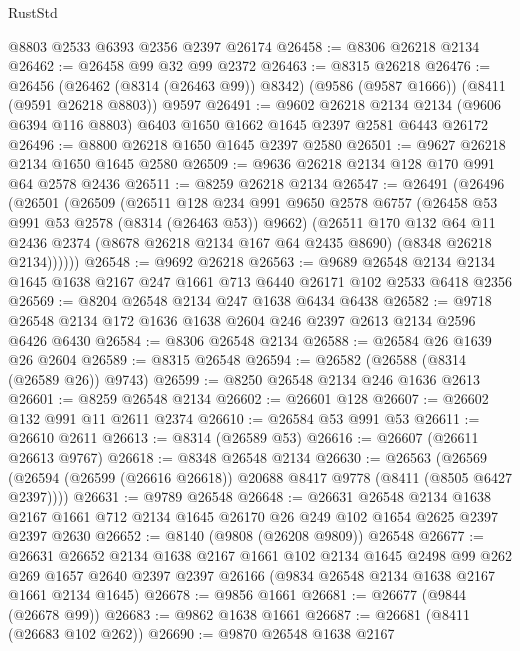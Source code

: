 \begin{lexlean}{RustStd}
\begin{coremodule}
    @8803
    @2533
    @6393
    @2356
    @2397
    @26174
@26458 := @8306 @26218 @2134
@26462 := @26458 @99 @32 @99 @2372
@26463 := @8315 @26218
@26476 := @26456
    (@26462 (@8314 (@26463 @99)) @8342)
    (@9586 (@9587 @1666))
    (@8411 (@9591 @26218 @8803))
    @9597
@26491 := @9602
    @26218
    @2134
    @2134
    (@9606 @6394 @116 @8803)
    @6403
    @1650
    @1662
    @1645
    @2397
    @2581
    @6443
    @26172
@26496 := @8800 @26218 @1650 @1645 @2397 @2580
@26501 := @9627 @26218 @2134 @1650 @1645 @2580
@26509 := @9636 @26218 @2134 @128 @170 @991 @64 @2578 @2436
@26511 := @8259 @26218 @2134
@26547 := @26491
    (@26496
      (@26501
        (@26509
          (@26511
            @128
            @234
            @991
            @9650
            @2578
            @6757
            (@26458 @53 @991 @53 @2578 (@8314 (@26463 @53)) @9662)
            (@26511
              @170
              @132
              @64
              @11
              @2436
              @2374
              (@8678 @26218 @2134 @167 @64 @2435 @8690)
              (@8348 @26218 @2134))))))
@26548 := @9692 @26218
@26563 := @9689
    @26548
    @2134
    @2134
    @1645
    @1638
    @2167
    @247
    @1661
    @713
    @6440
    @26171
    @102
    @2533
    @6418
    @2356
@26569 := @8204 @26548 @2134 @247 @1638 @6434 @6438
@26582 := @9718 @26548 @2134 @172 @1636 @1638 @2604 @246 @2397 @2613 @2134 @2596 @6426 @6430
@26584 := @8306 @26548 @2134
@26588 := @26584 @26 @1639 @26 @2604
@26589 := @8315 @26548
@26594 := @26582 (@26588 (@8314 (@26589 @26)) @9743)
@26599 := @8250 @26548 @2134 @246 @1636 @2613
@26601 := @8259 @26548 @2134
@26602 := @26601 @128
@26607 := @26602 @132 @991 @11 @2611 @2374
@26610 := @26584 @53 @991 @53
@26611 := @26610 @2611
@26613 := @8314 (@26589 @53)
@26616 := @26607 (@26611 @26613 @9767)
@26618 := @8348 @26548 @2134
@26630 := @26563
    (@26569 (@26594 (@26599 (@26616 @26618)) @20688 @8417 @9778 (@8411 (@8505 @6427 @2397))))
@26631 := @9789 @26548
@26648 := @26631
    @26548
    @2134
    @1638
    @2167
    @1661
    @712
    @2134
    @1645
    @26170
    @26
    @249
    @102
    @1654
    @2625
    @2397
    @2397
    @2630
@26652 := @8140 (@9808 (@26208 @9809)) @26548
@26677 := @26631
    @26652
    @2134
    @1638
    @2167
    @1661
    @102
    @2134
    @1645
    @2498
    @99
    @262
    @269
    @1657
    @2640
    @2397
    @2397
    @26166
    (@9834 @26548 @2134 @1638 @2167 @1661 @2134 @1645)
@26678 := @9856 @1661
@26681 := @26677 (@9844 (@26678 @99))
@26683 := @9862 @1638 @1661
@26687 := @26681 (@8411 (@26683 @102 @262))
@26690 := @9870 @26548 @1638 @2167

\end{coremodule}
\end{lexlean}
